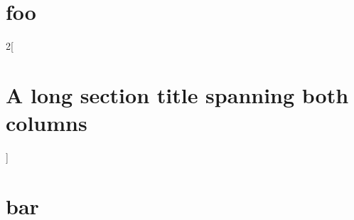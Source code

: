 \documentclass{article}
\begin{document}
\section{foo}

\lipsum[1]

\begin{multicols}{2}[%
	\section{A long section title spanning both columns}%
]
	\lipsum[1]
\end{multicols}


\section{bar}

\lipsum[1]
\end{document}
